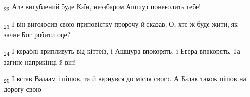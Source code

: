 \begin{tcolorbox}
\textsubscript{22} Але вигублений буде Каїн, незабаром Ашшур поневолить тебе!
\end{tcolorbox}
\begin{tcolorbox}
\textsubscript{23} І він виголосив свою приповістку пророчу й сказав: О, хто ж буде жити, як зачне Бог робити оце?
\end{tcolorbox}
\begin{tcolorbox}
\textsubscript{24} І кораблі припливуть від кіттеїв, і Ашшура впокорять, і Евера впокорять. Та загине наприкінці й він!
\end{tcolorbox}
\begin{tcolorbox}
\textsubscript{25} І встав Валаам і пішов, та й вернувся до місця свого. А Балак також пішов на дорогу свою.
\end{tcolorbox}
